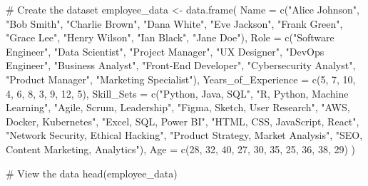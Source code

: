\documentclass[
  11pt,
  a4paper]{article}
\newenvironment{Shaded}{\begin{snugshade}}{\end{snugshade}}
\newcommand{\AttributeTok}[1]{\textcolor[rgb]{0.40,0.45,0.13}{#1}}
\newcommand{\CommentTok}[1]{\textcolor[rgb]{0.37,0.37,0.37}{#1}}
\newcommand{\DecValTok}[1]{\textcolor[rgb]{0.68,0.00,0.00}{#1}}
\newcommand{\FunctionTok}[1]{\textcolor[rgb]{0.28,0.35,0.67}{#1}}
\newcommand{\NormalTok}[1]{\textcolor[rgb]{0.00,0.23,0.31}{#1}}
\newcommand{\OtherTok}[1]{\textcolor[rgb]{0.00,0.23,0.31}{#1}}
\newcommand{\StringTok}[1]{\textcolor[rgb]{0.13,0.47,0.30}{#1}}
\begin{document}
\begin{Shaded}
\begin{Highlighting}[]
\CommentTok{\# Create the dataset}
\NormalTok{employee\_data }\OtherTok{\textless{}{-}} \FunctionTok{data.frame}\NormalTok{(}
  \AttributeTok{Name =} \FunctionTok{c}\NormalTok{(}\StringTok{"Alice Johnson"}\NormalTok{, }\StringTok{"Bob Smith"}\NormalTok{, }\StringTok{"Charlie Brown"}\NormalTok{, }\StringTok{"Dana White"}\NormalTok{, }\StringTok{"Eve Jackson"}\NormalTok{,}
           \StringTok{"Frank Green"}\NormalTok{, }\StringTok{"Grace Lee"}\NormalTok{, }\StringTok{"Henry Wilson"}\NormalTok{, }\StringTok{"Ian Black"}\NormalTok{, }\StringTok{"Jane Doe"}\NormalTok{),}
  \AttributeTok{Role =} \FunctionTok{c}\NormalTok{(}\StringTok{"Software Engineer"}\NormalTok{, }\StringTok{"Data Scientist"}\NormalTok{, }\StringTok{"Project Manager"}\NormalTok{, }\StringTok{"UX Designer"}\NormalTok{,}
           \StringTok{"DevOps Engineer"}\NormalTok{, }\StringTok{"Business Analyst"}\NormalTok{, }\StringTok{"Front{-}End Developer"}\NormalTok{, }
           \StringTok{"Cybersecurity Analyst"}\NormalTok{, }\StringTok{"Product Manager"}\NormalTok{, }\StringTok{"Marketing Specialist"}\NormalTok{),}
  \AttributeTok{Years\_of\_Experience =} \FunctionTok{c}\NormalTok{(}\DecValTok{5}\NormalTok{, }\DecValTok{7}\NormalTok{, }\DecValTok{10}\NormalTok{, }\DecValTok{4}\NormalTok{, }\DecValTok{6}\NormalTok{, }\DecValTok{8}\NormalTok{, }\DecValTok{3}\NormalTok{, }\DecValTok{9}\NormalTok{, }\DecValTok{12}\NormalTok{, }\DecValTok{5}\NormalTok{),}
  \AttributeTok{Skill\_Sets =} \FunctionTok{c}\NormalTok{(}\StringTok{"Python, Java, SQL"}\NormalTok{, }\StringTok{"R, Python, Machine Learning"}\NormalTok{, }\StringTok{"Agile, Scrum, Leadership"}\NormalTok{, }
                 \StringTok{"Figma, Sketch, User Research"}\NormalTok{, }\StringTok{"AWS, Docker, Kubernetes"}\NormalTok{, }\StringTok{"Excel, SQL, Power BI"}\NormalTok{, }
                 \StringTok{"HTML, CSS, JavaScript, React"}\NormalTok{, }\StringTok{"Network Security, Ethical Hacking"}\NormalTok{, }
                 \StringTok{"Product Strategy, Market Analysis"}\NormalTok{, }\StringTok{"SEO, Content Marketing, Analytics"}\NormalTok{),}
  \AttributeTok{Age =} \FunctionTok{c}\NormalTok{(}\DecValTok{28}\NormalTok{, }\DecValTok{32}\NormalTok{, }\DecValTok{40}\NormalTok{, }\DecValTok{27}\NormalTok{, }\DecValTok{30}\NormalTok{, }\DecValTok{35}\NormalTok{, }\DecValTok{25}\NormalTok{, }\DecValTok{36}\NormalTok{, }\DecValTok{38}\NormalTok{, }\DecValTok{29}\NormalTok{)}
\NormalTok{)}

\CommentTok{\# View the data}
\FunctionTok{head}\NormalTok{(employee\_data)}
\end{Highlighting}
\end{Shaded}
\end{document}
